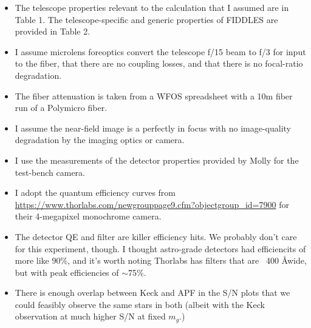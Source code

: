 \documentclass[onecolumn,floatfix,tighten]{aastex62}
\begin{document}
\begin{itemize}
\item The telescope properties relevant to the calculation that I
assumed are in Table 1. The telescope-specific and generic properties
of FIDDLES are provided in Table 2.

\item I assume microlens foreoptics convert the telescope f/15 beam
to f/3 for input to the fiber, that there are no coupling losses, and
that there is no focal-ratio degradation.

\item The fiber attenuation is taken from a WFOS spreadsheet with a
10m fiber run of a Polymicro fiber.

\item I assume the near-field image is a perfectly in focus with no
image-quality degradation by the imaging optics or camera.

\item I use the measurements of the detector properties provided by
Molly for the test-bench camera.

\item I adopt the quantum efficiency curves from
\url{https://www.thorlabs.com/newgrouppage9.cfm?objectgroup_id=7900}
for their 4-megapixel monochrome camera.

\end{itemize}

\begin{itemize}

\item The detector QE and filter are killer efficiency hits. We
probably don't care for this experiment, though. I thought
astro-grade detectors had efficiencits of more like 90\%, and it's
worth noting Thorlabs has filters that are ~400 \AA wide, but with
peak efficiencies of $\sim$75\%.

\item There is enough overlap between Keck and APF in the S/N plots
that we could feasibly observe the same stars in both (albeit with
the Keck observation at much higher S/N at fixed $m_g$.)

\end{itemize}

\end{document}
